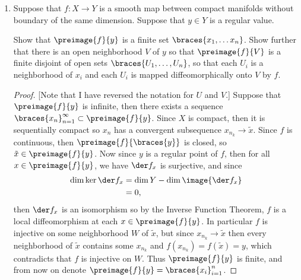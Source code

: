 \documentclass[12pt,letterpaper]{article}
\renewcommand{\H}{\mathbb{H}}
\begin{document}
\begin{enumerate}
\begin{proof}
Thus in either case, we can produce a neighborhood of $x$ in $\preimage{f}{[0,\infty)}$ diffeomorphic to an open set in $\H^k$, so $\preimage{f}{[0,\infty)}$ is a $k$-manifold with boundary. 
\end{proof}



\pagebreak
\item Suppose that $f : X \to Y$ is a smooth map between compact manifolds
without boundary of the same dimension. Suppose that $y\in Y$ is a regular
value.

Show that $\preimage{f}{y}$ is a finite set $\braces{x_1, \dots x_n}$. Show further that there is an open neighborhood $V$ of $y$ so that $\preimage{f}{V}$ is a finite disjoint of open sets $\braces{U_1, \dots, U_n}$, so that each $U_i$ is a neighborhood of $x_i$ and each $U_i$ is mapped
diffeomorphically onto $V$ by $f$.
\begin{proof}

[Note that I have reversed the notation for $U$ and $V$.] Suppose that $\preimage{f}{y}$ is infinite, then there exists a sequence $\braces{x_n}_{n=1}^\infty\subset \preimage{f}{y}$. Since $X$ is compact, then it is sequentially compact so $x_n$ has a convergent subsequence $x_{n_k}\to \tilde{x}$. Since $f$ is continuous, then $\preimage{f}{\braces{y}}$ is closed, so $\tilde{x}\in \preimage{f}{y}$. 
\vspace*{-\baselineskip}
\vspace*{-\baselineskip}
Now since $y$ is a regular point of $f$, then for all $x\in \preimage{f}{y}$, we have $\der f_x$ is surjective, and since 
\begin{align*}
\dim \ker \der f_x &= \dim Y - \dim \image{\der f_x}\\
&= 0,
\end{align*}
then $\der f_x$ is an isomorphism so by the Inverse Function Theorem, $f$ is a local diffeomorphism at each $x\in \preimage{f}{y}$. In particular $f$ is injective on some neighborhood $W$ of $\tilde{x}$, but since $x_{n_k}\to \tilde{x}$ then every neighborhood of $\tilde{x}$ contains some $x_{n_k}$ and $f(x_{n_k})=f(\tilde{x}) = y$, which contradicts that $f$ is injective on $W$. Thus $\preimage{f}{y}$ is finite, and from now on denote $\preimage{f}{y}=\braces{x_i}_{i=1}^n$. 


\end{proof}
\end{enumerate}
\end{document}
